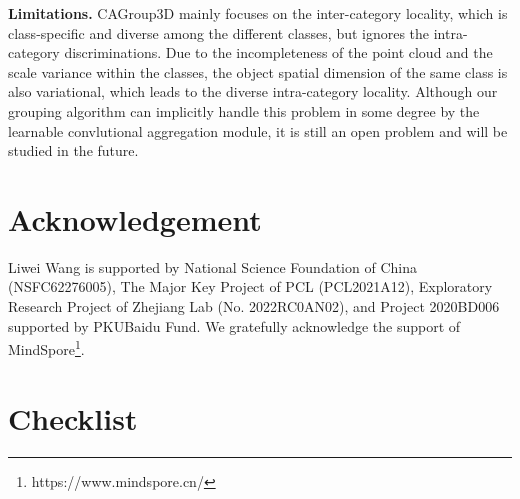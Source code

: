 \documentclass{article}
\begin{document}
\textbf{Limitations.} CAGroup3D mainly focuses on the inter-category locality, which is class-specific and diverse
among the different classes, but ignores the intra-category discriminations. Due to the incompleteness of the point cloud and the scale variance within the classes, the object spatial dimension of the same class is also variational, which leads to the diverse intra-category locality. Although our grouping algorithm can implicitly handle this problem in some degree by the learnable convlutional aggregation module, it is still an open problem and will be studied in the future.

\section*{Acknowledgement}
Liwei Wang is supported by National Science Foundation of China (NSFC62276005), The Major Key Project of PCL (PCL2021A12), Exploratory Research Project of Zhejiang Lab (No. 2022RC0AN02), and Project 2020BD006 supported by PKUBaidu Fund. We gratefully acknowledge the support of MindSpore\footnote{https://www.mindspore.cn/}.




\section*{Checklist}
\end{document}
